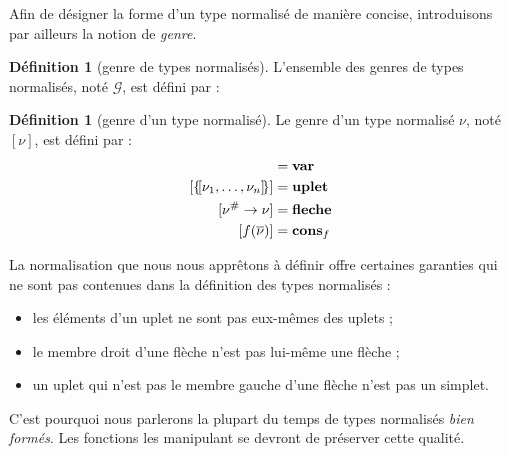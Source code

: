 \documentclass[a4paper]{report}
\theoremstyle{definition}
\newtheorem{definition}[theoreme]{Définition}
\newcommand{\mset}[1]{\{\![#1]\!\}}
\newcommand{\F}{\mathscr{F}}
\newcommand{\G}{\mathscr{G}}
\begin{document}
Afin de désigner la forme d'un type normalisé de manière concise, introduisons par ailleurs la notion de \emph{genre}.

\begin{definition}[genre de types normalisés]
  L'ensemble des genres de types normalisés, noté $\G$, est défini par :
\end{definition}

\begin{definition}[genre d'un type normalisé]
  Le genre d'un type normalisé $\nu$, noté $[\nu]$, est défini par :
  \begin{align*}
      [ \alpha ] &= \bold{var}
    \\
      [ \mset{\nu_1, \dots, \nu_n} ] &= \bold{uplet}
    \\
      [ \nu^\# \rightarrow \nu ] &= \bold{fleche}
    \\
      [ f (\overline \nu) ] &= \bold{cons}_f
  \end{align*}
\end{definition}

La normalisation que nous nous apprêtons à définir offre certaines garanties qui ne sont pas contenues dans la définition des types normalisés :
\begin{itemize}[nosep]
  \item les éléments d'un uplet ne sont pas eux-mêmes des uplets ;
  \item le membre droit d'une flèche n'est pas lui-même une flèche ;
  \item un uplet qui n'est pas le membre gauche d'une flèche n'est pas un simplet.
\end{itemize}
C'est pourquoi nous parlerons la plupart du temps de types normalisés \emph{bien formés}. Les fonctions les manipulant se devront de préserver cette qualité.
\end{document}
